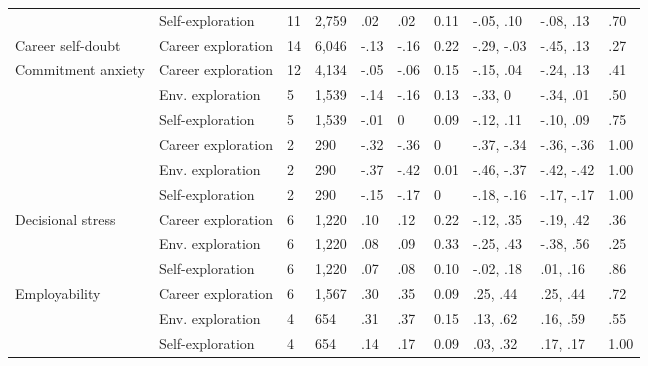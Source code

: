 \begin{table}[ht]
\begin{tabular}{llllllllll}
   & \hspace{0.8em}Self-exploration & 11 & 2,759 & .02 & .02 & 0.11 & -.05, .10 & -.08, .13 & .70 \\ 
  Career self-doubt & Career exploration & 14 & 6,046 & -.13 & -.16 & 0.22 & -.29, -.03 & -.45, .13 & .27 \\ 
  Commitment anxiety & Career exploration & 12 & 4,134 & -.05 & -.06 & 0.15 & -.15, .04 & -.24, .13 & .41 \\ 
   & \hspace{0.8em}Env. exploration & 5 & 1,539 & -.14 & -.16 & 0.13 & -.33, 0 & -.34, .01 & .50 \\ 
   & \hspace{0.8em}Self-exploration & 5 & 1,539 & -.01 & 0 & 0.09 & -.12, .11 & -.10, .09 & .75 \\ 
   & Career exploration & 2 & 290 & -.32 & -.36 & 0 & -.37, -.34 & -.36, -.36 & 1.00 \\ 
   & \hspace{0.8em}Env. exploration & 2 & 290 & -.37 & -.42 & 0.01 & -.46, -.37 & -.42, -.42 & 1.00 \\ 
   & \hspace{0.8em}Self-exploration & 2 & 290 & -.15 & -.17 & 0 & -.18, -.16 & -.17, -.17 & 1.00 \\ 
  Decisional stress & Career exploration & 6 & 1,220 & .10 & .12 & 0.22 & -.12, .35 & -.19, .42 & .36 \\ 
   & \hspace{0.8em}Env. exploration & 6 & 1,220 & .08 & .09 & 0.33 & -.25, .43 & -.38, .56 & .25 \\ 
   & \hspace{0.8em}Self-exploration & 6 & 1,220 & .07 & .08 & 0.10 & -.02, .18 & .01, .16 & .86 \\ 
  Employability & Career exploration & 6 & 1,567 & .30 & .35 & 0.09 & .25, .44 & .25, .44 & .72 \\ 
   & \hspace{0.8em}Env. exploration & 4 & 654 & .31 & .37 & 0.15 & .13, .62 & .16, .59 & .55 \\ 
   & \hspace{0.8em}Self-exploration & 4 & 654 & .14 & .17 & 0.09 & .03, .32 & .17, .17 & 1.00 \\ 
   \hline
\end{tabular}
\end{table}
